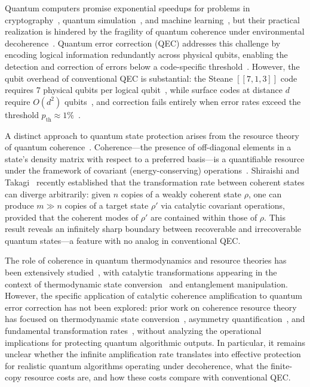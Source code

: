 \documentclass[prx,twocolumn,superscriptaddress,longbibliography,floatfix]{revtex4-2}
\begin{document}
Quantum computers promise exponential speedups for problems in cryptography~\cite{Regev2024,Shor1997}, quantum simulation~\cite{Campbell2019,Feynman1982}, and machine learning~\cite{Ivashkov2024,Biamonte2017}, but their practical realization is hindered by the fragility of quantum coherence under environmental decoherence~\cite{Zurek2003,NielsenChuang2010}.
Quantum error correction (QEC) addresses this challenge by encoding logical information redundantly across physical qubits, enabling the detection and correction of errors below a code-specific threshold~\cite{Shor1995,Gottesman1997}.
However, the qubit overhead of conventional QEC is substantial: the Steane $[\![7,1,3]\!]$ code requires 7 physical qubits per logical qubit~\cite{Steane1996}, while surface codes at distance $d$ require $O(d^2)$ qubits~\cite{Kitaev2003,Fowler2012}, and correction fails entirely when error rates exceed the threshold $p_\mathrm{th} \approx 1\%$~\cite{Knill2005}.

A distinct approach to quantum state protection arises from the resource theory of quantum coherence~\cite{Baumgratz2014,Streltsov2017}.
Coherence---the presence of off-diagonal elements in a state's density matrix with respect to a preferred basis---is a quantifiable resource under the framework of covariant (energy-conserving) operations~\cite{Marvian2014,Lostaglio2019}.
Shiraishi and Takagi~\cite{Shiraishi2024} recently established that the transformation rate between coherent states can diverge arbitrarily: given $n$ copies of a weakly coherent state $\rho$, one can produce $m \gg n$ copies of a target state $\rho'$ via catalytic covariant operations, provided that the coherent modes of $\rho'$ are contained within those of $\rho$.
This result reveals an infinitely sharp boundary between recoverable and irrecoverable quantum states---a feature with no analog in conventional QEC.

The role of coherence in quantum thermodynamics and resource theories has been extensively studied~\cite{Lostaglio2019,Streltsov2017,Marvian2014}, with catalytic transformations appearing in the context of thermodynamic state conversion~\cite{Baumgratz2014} and entanglement manipulation.
However, the specific application of catalytic coherence amplification to quantum error correction has not been explored: prior work on coherence resource theory has focused on thermodynamic state conversion~\cite{Lostaglio2019}, asymmetry quantification~\cite{Marvian2014}, and fundamental transformation rates~\cite{Shiraishi2024}, without analyzing the operational implications for protecting quantum algorithmic outputs.
In particular, it remains unclear whether the infinite amplification rate translates into effective protection for realistic quantum algorithms operating under decoherence, what the finite-copy resource costs are, and how these costs compare with conventional QEC.
\end{document}
